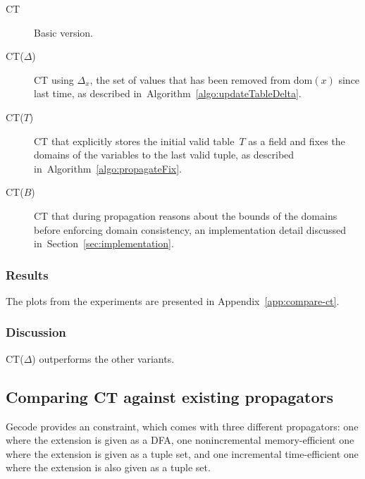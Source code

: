 \documentclass[a4paper,11pt]{article}
\newcommand{\Todo}[1]{{\color{blue}#1}}
\newcommand{\Secref}[1]{Section~\ref{#1}}
\newcommand{\Algoref}[1]{Algorithm~\ref{#1}}
\newcommand{\Dom}[1]{\text{dom}({#1})}
\numberwithin{equation}{section}
\begin{document}
\begin{description}
  \item[CT] Basic version.
  \item[CT($\Delta$)] CT using $\Delta_x$, the set
    of values that has been removed from $\Dom{x}$
    since last time, as described in~\Algoref{algo:updateTableDelta}.
  \item[CT($T$)] CT that explicitly stores the initial valid table~$T$ as
    a field and
    fixes the domains of the variables to the last valid tuple, as described
    in~\Algoref{algo:propagateFix}.
  \item[CT($B$)] CT that during propagation reasons about the bounds of the domains before
    enforcing domain consistency, an implementation detail discussed in~\Secref{sec:implementation}.
\end{description}

\subsubsection{Results}

The plots from the experiments are presented in Appendix~\ref{app:compare-ct}.

\subsubsection{Discussion}
\Todo{CT($\Delta$) outperforms the other variants.}

\subsection{Comparing CT against existing propagators}

Gecode provides an  constraint, which
comes with three different propagators: one where the extension
is given as a DFA, one nonincremental memory-efficient one where
the extension is given as a tuple set, and one incremental
time-efficient one where the extension is also given as a tuple set.
\end{document}
